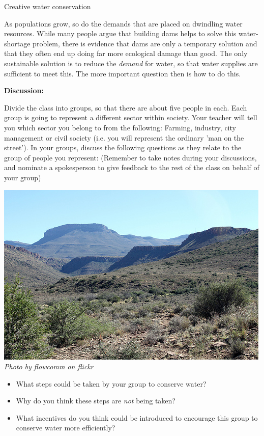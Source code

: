             \begin{groupdiscussion}{ Creative water conservation
}
            \nopagebreak

\label{m38138*uid289435}As populations grow, so do the demands that are placed on dwindling water resources. While many people argue that building dams helps to solve this water-shortage problem, there is evidence that dams are only a temporary solution and that they often end up doing far more ecological damage than good. The only sustainable solution is to reduce the \textsl{demand} for water, so that water supplies are sufficient to meet this. The more important question then is how to do this.
\par 
\label{m38138*uid5630}\textbf{Discussion:}\newline
\begin{minipage}{.6\textwidth}
    Divide the class into groups, so that there are about five people in each. Each group is going to represent a different sector within society. Your teacher will tell you which sector you belong to from the following: Farming, industry, city management or civil society (i.e. you will represent the ordinary 'man on the street'). In your groups, discuss the following questions as they relate to the group of people you represent: (Remember to take notes during your discussions, and nominate a spokesperson to give feedback to the rest of the class on behalf of your group)
\end{minipage}
\begin{minipage}{.4\textwidth}
 \begin{center}
  \includegraphics[width=.6\textwidth]{photos/karoo_flowcomm.jpg} \\
\textsl{Photo by flowcomm on flickr}
 \end{center}

\end{minipage}
\label{m38138*id342317}\begin{itemize}[noitemsep]
            \label{m38138*uid88}\item What steps could be taken by your group to conserve water?
\label{m38138*uid89}\item Why do you think these steps are \textsl{not} being taken?
\label{m38138*uid90}\item What incentives do you think could be introduced to encourage this group to conserve water more efficiently?
\end{itemize}


\end{groupdiscussion}
